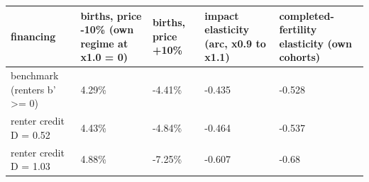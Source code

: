 \begingroup\small
\setlength{\tabcolsep}{3pt}
\renewcommand{\arraystretch}{1.04}
\begin{tabularx}{\linewidth}{XXXXX}
\toprule
financing & births, price -10\% (own regime at x1.0 = 0) & births, price +10\% & impact elasticity (arc, x0.9 to x1.1) & completed-fertility elasticity (own cohorts) \\
\midrule
benchmark (renters b' \textgreater{}= 0) & 4.29\% & -4.41\% & -0.435 & -0.528 \\
renter credit D = 0.52 & 4.43\% & -4.84\% & -0.464 & -0.537 \\
renter credit D = 1.03 & 4.88\% & -7.25\% & -0.607 & -0.68 \\
\bottomrule
\end{tabularx}
\endgroup
